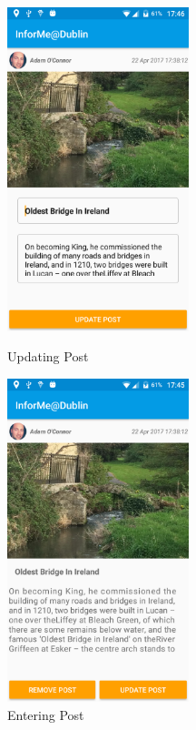 \begin{figure}[!tbp]
	\centering
	\begin{minipage}[b]{0.4\textwidth}
		\includegraphics[width=150pt]{Updating-Post}
		\caption{ Updating Post}
		\label{Figure: Updating Post}
	\end{minipage}
	\hfill
	\begin{minipage}[b]{0.4\textwidth}
		\includegraphics[width=150pt]{onClickPost}
		\caption{Entering Post} 
		\label{Figure: Entering Post}
	\end{minipage}
\end{figure}
